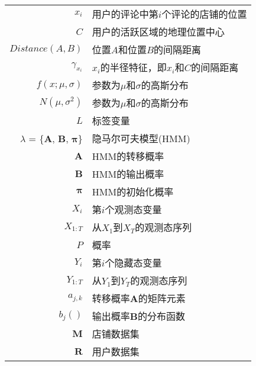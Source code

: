 \begin{nomenclaturename}
\label{chap:symb}

\begin{longtable}{rl}
$x_i$ &  用户的评论中第$i$个评论的店铺的位置\\
$C$ &  用户的活跃区域的地理位置中心\\
$Distance(A, B)$ & 位置$A$和位置$B$的间隔距离 \\
$\gamma_{x_i}$ &  $x_i$的半径特征，即$x_i$和$C$的间隔距离\\
$f(x;\mu,\sigma)$ & 参数为$\mu$和$\sigma$的高斯分布\\
$N(\mu, \sigma^2)$ & 参数为$\mu$和$\sigma$的高斯分布 \\
$L$ &  标签变量\\
$\lambda$ = \{$\mathbf{A}$, $\mathbf{B}$, $\mathbf{\pi}$\} &  隐马尔可夫模型(HMM)\\
$\mathbf{A}$ &  HMM的转移概率 \\
$\mathbf{B}$ &  HMM的输出概率 \\
$\mathbf{\pi}$ &  HMM的初始化概率\\
$X_i$ &  第$i$个观测态变量\\
$X_{1:T}$ &  从$X_1$到$X_T$的观测态序列 \\
$P$ & 概率 \\
$Y_i$ &  第$i$个隐藏态变量\\
$Y_{1:T}$ &  从$Y_1$到$Y_T$的观测态序列 \\
$a_{j,k}$ &  转移概率$\mathbf{A}$的矩阵元素 \\
$b_j()$ &  输出概率$\mathbf{B}$的分布函数 \\
$\mathbf{M}$ &  店铺数据集\\
$\mathbf{R}$ &  用户数据集\\
\end{longtable}

\end{nomenclaturename}
